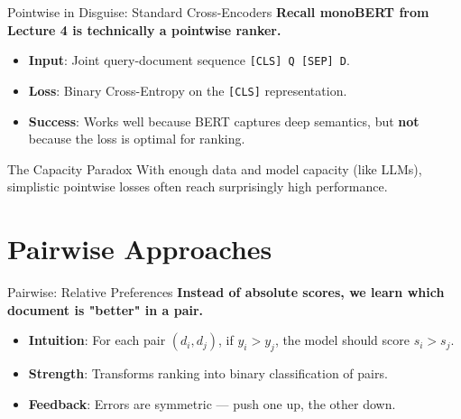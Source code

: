 \documentclass[aspectratio=169]{beamer}
\newif\ifanimated
\newcommand{\cpause}{\ifanimated\pause\fi}
\begin{document}
\begin{frame}{Pointwise in Disguise: Standard Cross-Encoders}
\textbf{Recall monoBERT from Lecture 4 is technically a pointwise ranker.}

\vspace{0.8em}
\begin{itemize}
    \item \textbf{Input}: Joint query-document sequence \texttt{[CLS] Q [SEP] D}.
    \item \textbf{Loss}: Binary Cross-Entropy on the \texttt{[CLS]} representation.
    \item \textbf{Success}: Works well because BERT captures deep semantics, but \textbf{not} because the loss is optimal for ranking.
\end{itemize}\cpause

\vspace{1em}
\begin{exampleblock}{The Capacity Paradox}
With enough data and model capacity (like LLMs), simplistic pointwise losses often reach surprisingly high performance.
\end{exampleblock}
\end{frame}

\section{Pairwise Approaches}

\begin{frame}[plain]
\sectionpage
\end{frame}

\begin{frame}{Pairwise: Relative Preferences}
\textbf{Instead of absolute scores, we learn which document is "better" in a pair.}

\vspace{0.8em}
\begin{itemize}
    \item \textbf{Intuition}: For each pair $(d_i, d_j)$, if $y_i > y_j$, the model should score $s_i > s_j$.
    \item \textbf{Strength}: Transforms ranking into binary classification of pairs.
    \item \textbf{Feedback}: Errors are symmetric --- push one up, the other down.
\end{itemize}\cpause

\vspace{0.5em}
\begin{center}

\end{center}
\end{frame}
\end{document}
